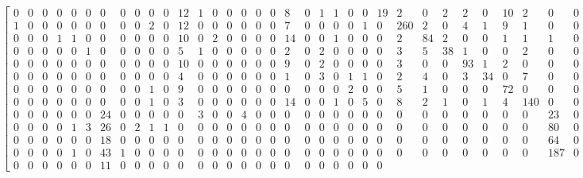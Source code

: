 \begin{equation*}
\begin{bmatrix}
0	&	0	&	0	&	0	&	0	&	0	&	0	&	0	&	0	&	0	&	0	&	12	&	1	&	0	&	0	&	0	&	0	&	0	&	8	&	0	&	1	&	1	&	0	&	0	&	19	&
2	&	0	&	2	&	2	&	0	&	10	&	2	&	0	&	0	&	0	&	0	&	0	&	0	&	0	&	0	&	0	&	0	&	0 \\
1	&	0	&	0	&	0	&	0	&	0	&	0	&	0	&	0	&	2	&	0	&	12	&	0	&	0	&	0	&	0	&	0	&	0	&	7	&	0	&	0	&	0	&	0	&	1	&	0	&
260	&	2	&	0	&	4	&	1	&	9	&	1	&	0	&	0	&	0	&	0	&	0	&	0	&	0	&	0	&	0	&	0	&	0 \\
0	&	0	&	0	&	1	&	1	&	0	&	0	&	0	&	0	&	0	&	0	&	10	&	0	&	2	&	0	&	0	&	0	&	0	&	14	&	0	&	0	&	1	&	0	&	0	&	0	&
2	&	84	&	2	&	0	&	0	&	1	&	1	&	1	&	0	&	0	&	0	&	0	&	0	&	0	&	0	&	0	&	0	&	0 \\
0	&	0	&	0	&	0	&	0	&	1	&	0	&	0	&	0	&	0	&	0	&	5	&	1	&	0	&	0	&	0	&	0	&	0	&	2	&	0	&	2	&	0	&	0	&	0	&	0	&
3	&	5	&	38	&	1	&	0	&	0	&	2	&	0	&	0	&	0	&	0	&	0	&	0	&	0	&	0	&	0	&	0	&	0 \\
0	&	0	&	0	&	0	&	0	&	0	&	0	&	0	&	0	&	0	&	0	&	10	&	0	&	0	&	0	&	0	&	0	&	0	&	9	&	0	&	2	&	0	&	0	&	0	&	0	&
3	&	0	&	0	&	93	&	1	&	2	&	0	&	0	&	0	&	0	&	0	&	0	&	0	&	0	&	0	&	0	&	0	&	0 \\
0	&	0	&	0	&	0	&	0	&	0	&	0	&	0	&	0	&	0	&	0	&	4	&	0	&	0	&	0	&	0	&	0	&	0	&	1	&	0	&	3	&	0	&	1	&	1	&	0	&
2	&	4	&	0	&	3	&	34	&	0	&	7	&	0	&	0	&	0	&	0	&	0	&	0	&	0	&	0	&	0	&	0	&	0 \\
0	&	0	&	0	&	0	&	0	&	0	&	0	&	0	&	0	&	1	&	0	&	9	&	0	&	0	&	0	&	0	&	0	&	0	&	0	&	0	&	0	&	0	&	2	&	0	&	0	&
5	&	1	&	0	&	0	&	0	&	72	&	0	&	0	&	0	&	0	&	0	&	0	&	0	&	0	&	0	&	0	&	0	&	0 \\
0	&	0	&	0	&	0	&	0	&	0	&	0	&	0	&	0	&	1	&	0	&	3	&	0	&	0	&	0	&	0	&	0	&	0	&	14	&	0	&	0	&	1	&	0	&	5	&	0	&
8	&	2	&	1	&	0	&	1	&	4	&	140	&	0	&	0	&	0	&	0	&	0	&	0	&	0	&	0	&	0	&	0	&	0 \\
0	&	0	&	0	&	0	&	0	&	0	&	24	&	0	&	0	&	0	&	0	&	0	&	3	&	0	&	0	&	4	&	0	&	0	&	0	&	0	&	0	&	0	&	0	&	0	&	0	&
0	&	0	&	0	&	0	&	0	&	0	&	0	&	23	&	0	&	0	&	0	&	0	&	0	&	0	&	0	&	0	&	1	&	5 \\
0	&	0	&	0	&	0	&	1	&	3	&	26	&	0	&	2	&	1	&	1	&	0	&	0	&	0	&	0	&	0	&	0	&	0	&	0	&	0	&	0	&	0	&	0	&	0	&	0	&
0	&	0	&	0	&	0	&	0	&	0	&	0	&	80	&	0	&	0	&	0	&	0	&	0	&	0	&	0	&	0	&	0	&	36 \\
0	&	0	&	0	&	0	&	0	&	0	&	18	&	0	&	0	&	0	&	0	&	0	&	0	&	0	&	0	&	0	&	0	&	0	&	0	&	0	&	0	&	0	&	0	&	0	&	0	&
0	&	0	&	0	&	0	&	0	&	0	&	0	&	64	&	0	&	0	&	0	&	0	&	0	&	0	&	0	&	0	&	5	&	3 \\
0	&	0	&	0	&	0	&	1	&	0	&	43	&	1	&	0	&	0	&	0	&	0	&	0	&	0	&	0	&	0	&	0	&	0	&	0	&	0	&	0	&	0	&	0	&	0	&	0	&
0	&	0	&	0	&	0	&	0	&	0	&	0	&	187	&	0	&	0	&	0	&	0	&	0	&	0	&	0	&	0	&	1	&	7 \\
0	&	0	&	0	&	0	&	0	&	0	&	11	&	0	&	0	&	0	&	0	&	0	&	0	&	0	&	0	&	0	&	0	&	0	&	0	&	0	&	0	&	0	&	0	&	0	&	0	&

\end{bmatrix}
\end{equation*}
